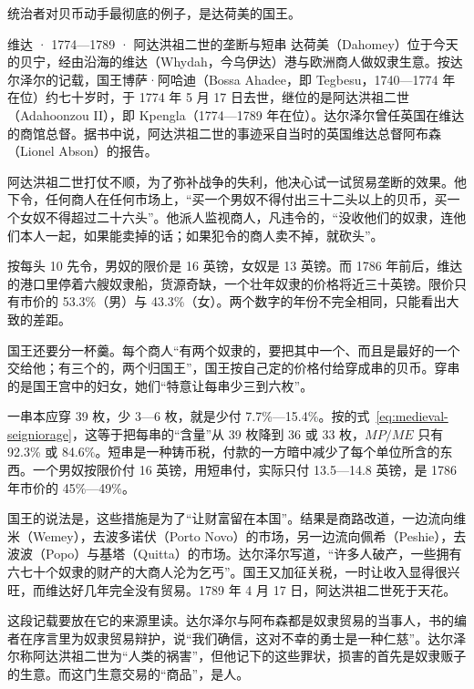 统治者对贝币动手最彻底的例子，是达荷美的国王。

\begin{case}{维达 · 1774—1789 · 阿达洪祖二世的垄断与短串}
达荷美（Dahomey）位于今天的贝宁，经由沿海的维达（Whydah，今乌伊达）港与欧洲商人做奴隶生意。按达尔泽尔的记载，国王博萨·阿哈迪（Bossa Ahadee，即 Tegbesu，1740—1774 年在位）约七十岁时，于 1774 年 5 月 17 日去世，继位的是阿达洪祖二世（Adahoonzou II）\cite{dalzel1793}，即 Kpengla（1774—1789 年在位）。达尔泽尔曾任英国在维达的商馆总督。据书中说，阿达洪祖二世的事迹采自当时的英国维达总督阿布森（Lionel Abson）的报告。

阿达洪祖二世打仗不顺，为了弥补战争的失利，他决心试一试贸易垄断的效果。他下令，任何商人在任何市场上，“买一个男奴不得付出三十二头以上的贝币，买一个女奴不得超过二十六头”。他派人监视商人，凡违令的，“没收他们的奴隶，连他们本人一起，如果能卖掉的话；如果犯令的商人卖不掉，就砍头”\cite{dalzel1793}。

按每头 10 先令，男奴的限价是 16 英镑，女奴是 13 英镑。而 1786 年前后，维达的港口里停着六艘奴隶船，货源奇缺，一个壮年奴隶的价格将近三十英镑\cite{dalzel1793}。限价只有市价的 53.3\%（男）与 43.3\%（女）。两个数字的年份不完全相同，只能看出大致的差距。

国王还要分一杯羹。每个商人“有两个奴隶的，要把其中一个、而且是最好的一个交给他；有三个的，两个归国王”，国王按自己定的价格付给穿成串的贝币\cite{dalzel1793}。穿串的是国王宫中的妇女，她们“特意让每串少三到六枚”\cite{dalzel1793}。

一串本应穿 39 枚，少 3—6 枚，就是少付 7.7\%—15.4\%。按的式~\eqref{eq:medieval-seigniorage}，这等于把每串的“含量”从 39 枚降到 36 或 33 枚，$MP/ME$ 只有 92.3\% 或 84.6\%。短串是一种铸币税，付款的一方暗中减少了每个单位所含的东西。一个男奴按限价付 16 英镑，用短串付，实际只付 13.5—14.8 英镑，是 1786 年市价的 45\%—49\%。

国王的说法是，这些措施是为了“让财富留在本国”\cite{dalzel1793}。结果是商路改道，一边流向维米（Wemey），去波多诺伏（Porto Novo）的市场，另一边流向佩希（Peshie），去波波（Popo）与基塔（Quitta）的市场。达尔泽尔写道，“许多人破产，一些拥有六七十个奴隶的财产的大商人沦为乞丐”。国王又加征关税，一时让收入显得很兴旺，而维达好几年完全没有贸易\cite{dalzel1793}。1789 年 4 月 17 日，阿达洪祖二世死于天花\cite{dalzel1793}。

这段记载要放在它的来源里读。达尔泽尔与阿布森都是奴隶贸易的当事人，书的编者在序言里为奴隶贸易辩护，说“我们确信，这对不幸的勇士是一种仁慈”\cite{dalzel1793}。达尔泽尔称阿达洪祖二世为“人类的祸害”\cite{dalzel1793}，但他记下的这些罪状，损害的首先是奴隶贩子的生意。而这门生意交易的“商品”，是人。
\end{case}

